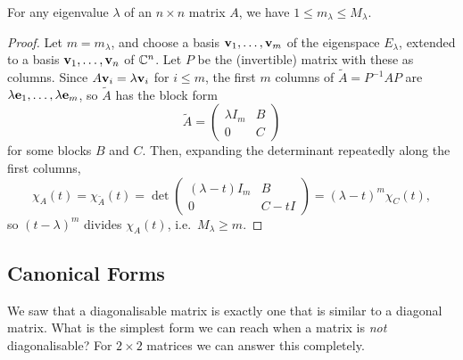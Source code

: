 \documentclass[a4paper]{scrartcl}
\begin{document}
\begin{proposition}
	For any eigenvalue $\lambda$ of an $n \times n$ matrix $A$, we have $1 \leq m_\lambda \leq M_\lambda$.
\end{proposition}
\begin{proof}
	Let $m = m_\lambda$, and choose a basis $\mathbf{v}_1, \dots, \mathbf{v}_m$ of the eigenspace $E_\lambda$, extended to a basis $\mathbf{v}_1, \dots, \mathbf{v}_n$ of $\mathbb{C}^n$. Let $P$ be the (invertible) matrix with these as columns. Since $A\mathbf{v}_i = \lambda \mathbf{v}_i$ for $i \leq m$, the first $m$ columns of $\tilde{A} = P^{-1}AP$ are $\lambda \mathbf{e}_1, \dots, \lambda \mathbf{e}_m$, so $\tilde A$ has the block form
	$$
	\tilde{A} = \begin{pmatrix}
		\lambda I_m & B \\
		0 & C
	\end{pmatrix}
	$$
	for some blocks $B$ and $C$. Then, expanding the determinant repeatedly along the first columns,
	$$
	\chi_A(t) = \chi_{\tilde A}(t) = \det \begin{pmatrix}
		(\lambda - t)I_m & B \\ 0 & C - tI
	\end{pmatrix} = (\lambda - t)^m \chi_C(t),
	$$
	so $(t - \lambda)^m$ divides $\chi_A(t)$, i.e.\ $M_\lambda \geq m$.
\end{proof}

\subsection{Canonical Forms}

We saw that a diagonalisable matrix is exactly one that is similar to a diagonal matrix. What is the simplest form we can reach when a matrix is \emph{not} diagonalisable? For $2 \times 2$ matrices we can answer this completely.
\end{document}
